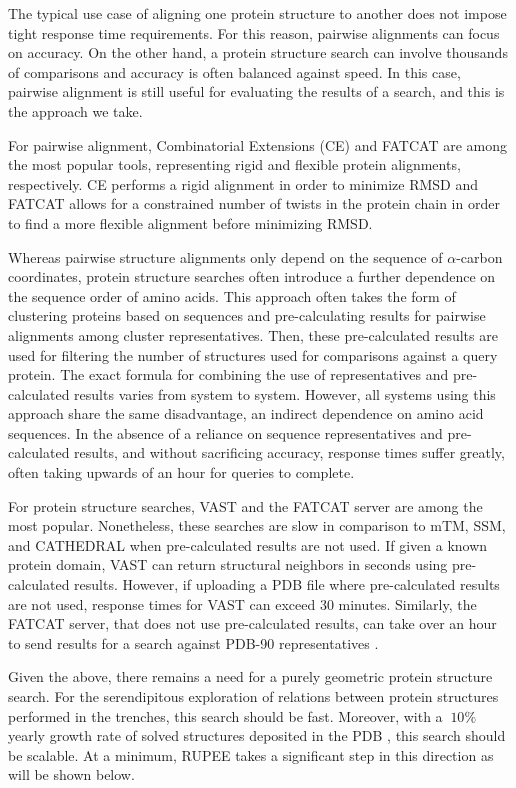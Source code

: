 \documentclass[10pt,letterpaper]{article}
\newcommand{\ca}{$\alpha$-carbon\xspace}
\begin{document}
The typical use case of aligning one protein structure to another does not impose tight response time requirements. 
For this reason, pairwise alignments can focus on accuracy. 
On the other hand, a protein structure search can involve thousands of comparisons and accuracy is often balanced against speed. 
In this case, pairwise alignment is still useful for evaluating the results of a search, and this is the approach we take. 

For pairwise alignment, Combinatorial Extensions (CE) \cite{Shindyalov1998} and FATCAT \cite{Ye2003} are among the most popular tools, representing rigid and flexible protein alignments, respectively. 
CE performs a rigid alignment in order to minimize RMSD and FATCAT allows for a constrained number of twists in the protein chain in order to find a more flexible alignment before minimizing RMSD.

Whereas pairwise structure alignments only depend on the sequence of \ca coordinates, protein structure searches often introduce a further dependence on the sequence order of amino acids.
This approach often takes the form of clustering proteins based on sequences and pre-calculating results for pairwise alignments among cluster representatives. 
Then, these pre-calculated results are used for filtering the number of structures used for comparisons against a query protein.
The exact formula for combining the use of representatives and pre-calculated results varies from system to system.
However, all systems using this approach share the same disadvantage, an indirect dependence on amino acid sequences. 
In the absence of a reliance on sequence representatives and pre-calculated results, and without sacrificing accuracy, response times suffer greatly, often taking upwards of an hour for queries to complete. 

For protein structure searches, VAST \cite{Gilbrat1996} and the FATCAT server \cite{Ye2004} are among the most popular. 
Nonetheless, these searches are slow in comparison to mTM, SSM, and CATHEDRAL when pre-calculated results are not used. 
If given a known protein domain, VAST can return structural neighbors in seconds using pre-calculated results. 
However, if uploading a PDB file where pre-calculated results are not used, response times for VAST can exceed 30 minutes. 
Similarly, the FATCAT server, that does not use pre-calculated results, can take over an hour to send results for a search against PDB-90 representatives \cite{Prlic2010}. 

Given the above, there remains a need for a purely geometric protein structure search.
For the serendipitous exploration of relations between protein structures performed in the trenches, this search should be fast. 
Moreover, with a $~10\%$ yearly growth rate of solved structures deposited in the PDB \cite{gkw1000}, this search should be scalable. 
At a minimum, RUPEE takes a significant step in this direction as will be shown below. 
\end{document}
